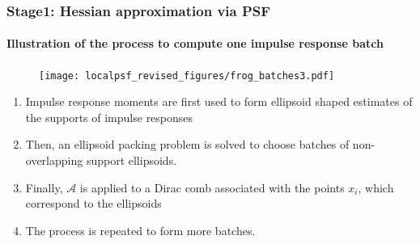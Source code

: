 \documentclass[10pt,final,xcolor=dvipsnames]{beamer}
\newcommand{\Aop}{\mathcal{A}}
\begin{document}
\begin{frame}
  \frametitle{Stage1: Hessian approximation via PSF}
  \framesubtitle{Illustration of the process to compute one impulse
    response batch}
\begin{figure}
	\centering \texttt{[image: localpsf\_revised\_figures/frog\_batches3.pdf]}
\end{figure}

\begin{enumerate}
\item Impulse response moments are first used to form ellipsoid shaped
  estimates of the supports of impulse responses
\item Then, an ellipsoid
  packing problem is solved to choose batches of non-overlapping
  support ellipsoids.
\item Finally,  $\Aop$ is applied to a Dirac comb associated with the
  points $x_i$, which correspond to the ellipsoids
\item  The process is
  repeated to form more batches.
\end{enumerate}

\end{frame}
\end{document}
